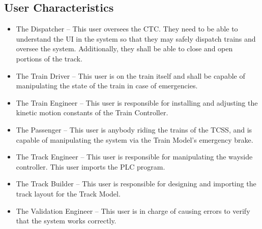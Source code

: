 \documentclass{article}
\begin{document}
    \subsection{User Characteristics}
     \begin{itemize}
         \item 
         The Dispatcher – This user oversees the CTC. They need to be able to understand the UI in the system so that they may safely dispatch trains and oversee the system. Additionally, they shall be able to close and open portions of the track.
         \item
         The Train Driver – This user is on the train itself and shall be capable of manipulating the state of the train in case of emergencies.
        \item
         The Train Engineer – This user is responsible for installing and adjusting the kinetic motion constants of the Train Controller.
         \item
         The Passenger – This user is anybody riding the trains of the TCSS, and is capable of manipulating the system via the Train Model's emergency brake.
         \item
         The Track Engineer – This user is responsible for manipulating the wayside controller. This user imports the PLC  program.
         \item
         The Track Builder – This user is responsible for designing and importing the track layout for the Track Model. 
         \item
         The Validation Engineer – This user is in charge of causing errors to verify that the system works correctly.
     \end{itemize}
     
\end{document}
